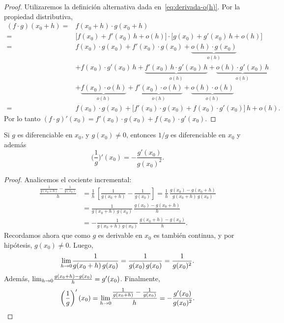 \begin{proof}
Utilizaremos la definición alternativa dada en~\eqref{eq:derivada-o(h)}.
Por la propiedad distributiva,
\begin{align*}
    (f\cdot g)(x_0+h) 
    ={}& f(x_0+h)\cdot g(x_0+h)
    \\
    ={}& \big[f(x_0)+f'(x_0)\, h + o(h)\big]
    \cdot \big[g(x_0)+g'(x_0)\, h + o(h)\big]
    \\
    ={}& f(x_0)\cdot g(x_0) 
    + f'(x_0)\cdot g(x_0) 
    + \underbrace{o(h) \cdot g(x_0) }_{o(h)}
    \\
    &+ f(x_0) \cdot g'(x_0) \, h
    + \underbrace{f'(x_0) \, h \cdot g'(x_0) \, h}_{o(h)}
    + \underbrace{o(h) \cdot g'(x_0) \, h}_{o(h)}
    \\
    &
    + \underbrace{f(x_0) \cdot o(h)}_{o(h)}
    + \underbrace{f'(x_0) \cdot o(h)}_{o(h)}
    + \underbrace{o(h) \cdot o(h)}_{o(h)}
    \\
    ={}& f(x_0)\cdot g(x_0) 
    + \big[ f'(x_0)\cdot g(x_0)+f(x_0)\cdot g'(x_0) \big] \, h 
    + o(h).
\end{align*}
Por lo tanto $(f\cdot g)'(x_0) = f'(x_0)\cdot g(x_0)+f(x_0)\cdot g'(x_0)$.
\end{proof}

\begin{proposition}
    Si $g$ es diferenciable en $x_0$, y $g(x_0)\neq 0$, entonces $1/g$ es diferenciable en $x_0$ y además
    \[
    \Big(\frac1g\Big)'(x_0) = - \frac{g'(x_0)}{g(x_0)^2}.
    \]
\end{proposition}

\begin{proof}
    Analicemos el cociente incremental:
    \begin{align*}
        \frac{\frac1{g(x_0+h)}-\frac1{g(x_0)}}h
        &= \frac1h \, \left[\frac1{g(x_0+h)}-\frac1{g(x_0)}\right]
        = \frac1h \, \frac{g(x_0)-g(x_0+h)}{g(x_0+h)\,g(x_0)}
        \\
        &= \frac1{g(x_0+h)\,g(x_0)} \, \frac{g(x_0)-g(x_0+h)}h
        \\
        &= - \frac1{g(x_0+h)\,g(x_0)} \, \frac{g(x_0+h)-g(x_0)}h.
    \end{align*}
    Recordamos ahora que como $g$ es derivable en $x_0$ es también continua, y por hipótesis, $g(x_0)\neq 0$. 
    Luego, 
    \[
    {\lim_{h\to 0}} \frac1{g(x_0+h)\,g(x_0)} = \frac1{g(x_0)\,g(x_0)} = \frac1{g(x_0)^2}. 
    \]
    Además, ${\lim_{h\to 0}} \frac{g(x_0+h)-g(x_0)}h = g'(x_0)$.
    Finalmente,
    \[
    \left(\frac1g\right)'(x_0) = {\lim_{h\to 0}} \frac{\frac1{g(x_0+h)}-\frac1{g(x_0)}}h = - \frac{g'(x_0)}{g(x_0)^2}.
    \qedhere
    \]
\end{proof}

